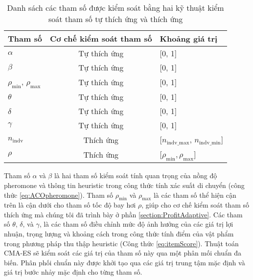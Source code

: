 \begin{table}[ht!]
    \begin{center}
        \begin{tabular}{lcl}
            \toprule
            Tham số            &   Cơ chế kiểm soát tham số  & Khoảng giá trị \\
            \midrule
            $\alpha$                    &   Tự thích ứng   & [0, 1]\\
            $\beta$                     &   Tự thích ứng  & [0, 1]     \\
            $\rho_{\text{min}}$, $\rho_{\text{max}}$  &   Tự thích ứng & [0, 1] \\
            $\theta$                    &   Tự thích ứng & [0, 1]             \\
            $\delta$                    &   Tự thích ứng & [0, 1]             \\
            $\gamma$                    &   Tự thích ứng & [0, 1]             \\
            $n_{\text{indv}}$           &   Thích ứng       & [$n_{\text{indv\_max}}$, $n_{\text{indv\_min}}$]  \\
            $\rho$                      &   Thích ứng         & [$\rho_{\text{min}}, \rho_\text{{max}}$] \\
            \bottomrule
        \end{tabular}
        \caption[Danh sách các tham số được kiểm soát bằng các kỹ thuật kiểm soát tham số]{\label{tab:control_param}Danh sách các tham số được kiểm soát bằng hai kỹ thuật kiểm soát tham số tự thích ứng và thích ứng}
    \end{center}
\end{table}

Tham số $\alpha$ và $\beta$ là hai tham số kiểm soát tính quan trọng của nồng độ pheromone và thông tin heuristic trong công thức tính xác suất di chuyển (công thức \ref{eq:ACOpheromone}). Tham số $\rho_{\text{min}}$ và $\rho_{\text{max}}$ là các tham số thể hiện cận trên là cận dưới cho tham số tốc độ bay hơi $\rho$, giúp cho cơ chế kiểm soát tham số thích ứng mà chúng tôi đã trình bày ở phần \ref{section:ProfitAdaptive}. Các tham số $\theta$, $\delta$, và $\gamma$, là các tham số điều chỉnh mức độ ảnh hưởng của các giá trị lợi nhuận, trọng lượng và khoảng cách trong công thức tính điểm của vật phẩm trong phương pháp thu thập heuristic (Công thức \ref{eq:itemScore}). Thuật toán CMA-ES sẽ kiểm soát các giá trị của tham số này qua một phân mối chuẩn đa biến. Phân phối chuẩn này được khởi tạo qua các giá trị trung tậm mặc định và giá trị bước nhảy mặc định cho từng tham số.


